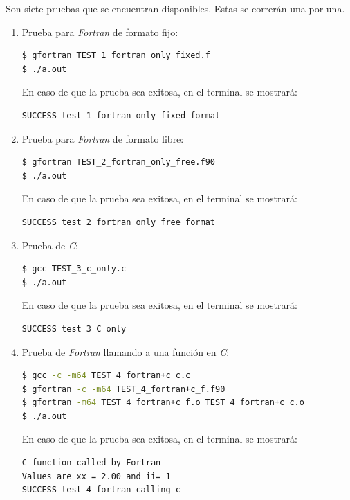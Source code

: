 \documentclass[12pt,letter]{article}
\begin{document}
\noindent Son siete pruebas que se encuentran disponibles. Estas se correr\'an una por una. 

\begin{enumerate}
\item Prueba para \textit{Fortran} de formato fijo:
\begin{lstlisting}[language=bash]
$ gfortran TEST_1_fortran_only_fixed.f
$ ./a.out
\end{lstlisting}

En caso de que la prueba sea exitosa, en el terminal se mostrar\'a:
\begin{lstlisting}[language=bash]
SUCCESS test 1 fortran only fixed format
\end{lstlisting}

\item Prueba para \textit{Fortran} de formato libre:
\begin{lstlisting}[language=bash]
$ gfortran TEST_2_fortran_only_free.f90
$ ./a.out
\end{lstlisting}

En caso de que la prueba sea exitosa, en el terminal se mostrar\'a:
\begin{lstlisting}[language=bash]
SUCCESS test 2 fortran only free format
\end{lstlisting}

\item Prueba de \textit{C}:
\begin{lstlisting}[language=bash]
$ gcc TEST_3_c_only.c
$ ./a.out
\end{lstlisting}

En caso de que la prueba sea exitosa, en el terminal se mostrar\'a:
\begin{lstlisting}[language=bash]
SUCCESS test 3 C only
\end{lstlisting}

\item Prueba de \textit{Fortran} llamando a una funci\'on en \textit{C}:
\begin{lstlisting}[language=bash]
$ gcc -c -m64 TEST_4_fortran+c_c.c
$ gfortran -c -m64 TEST_4_fortran+c_f.f90
$ gfortran -m64 TEST_4_fortran+c_f.o TEST_4_fortran+c_c.o
$ ./a.out
\end{lstlisting}

En caso de que la prueba sea exitosa, en el terminal se mostrar\'a:
\begin{lstlisting}[language=bash]
C function called by Fortran
Values are xx = 2.00 and ii= 1
SUCCESS test 4 fortran calling c
\end{lstlisting}



\end{enumerate}
\end{document}
